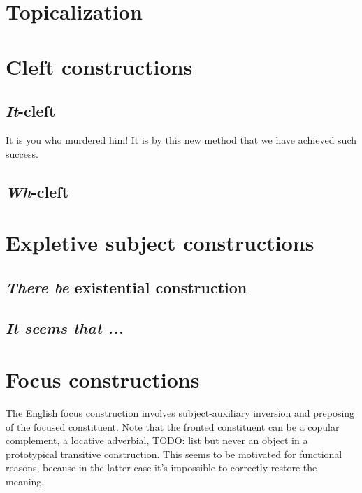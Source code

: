 \documentclass[UTF8, a4paper, oneside, scheme=plain]{ctexrep}
\newcommand{\corpus}[1]{\emph{#1}}
\begin{document}
\section{Topicalization}\label{sec:simple-clause.information.topicalization}

\section{Cleft constructions}

\subsection{\corpus{It}-cleft}

\begin{exe}
    \ex It is you who murdered him!
    \ex It is by this new method that we have achieved such success.
\end{exe}

\subsection{\corpus{Wh}-cleft}

\section{Expletive subject constructions}

\subsection{\corpus{There be} existential construction}

\begin{exe}
    \ex 
\end{exe}

\subsection{\corpus{It seems that ...}}

\section{Focus constructions}

The English focus construction involves subject-auxiliary inversion 
and preposing of the focused constituent.
Note that the fronted constituent can be a copular complement,
a locative adverbial, TODO: list 
but never an object in a prototypical transitive construction.
This seems to be motivated for functional reasons,
because in the latter case it's impossible to correctly restore the meaning.
\end{document}
